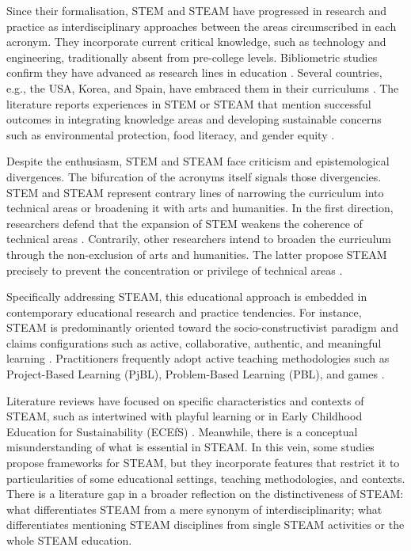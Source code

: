 \documentclass[english]{textolivre}
\begin{document}
Since their formalisation, STEM and STEAM have progressed in research and practice as interdisciplinary approaches between the areas circumscribed in each acronym. They incorporate current critical knowledge, such as technology and engineering, traditionally absent from pre-college levels. Bibliometric studies confirm they have advanced as research lines in education \cite{marin-marin_steam_2021}. Several countries, e.g., the USA, Korea, and Spain, have embraced them in their curriculums \cite{korea2013, ministerio2022real, ngss1900next}. The literature reports experiences in STEM or STEAM that mention successful outcomes in integrating knowledge areas and developing sustainable concerns such as environmental protection, food literacy, and gender equity \cite{costa-lizama_hack4women:_2022, silva-hormazabal_conectando_2022, stephenson_increasing_2022}.

Despite the enthusiasm, STEM and STEAM face criticism and epistemological divergences. The bifurcation of the acronyms itself signals those divergencies. STEM and STEAM represent contrary lines of narrowing the curriculum into technical areas or broadening it with arts and humanities. In the first direction, researchers defend that the expansion of STEM weakens the coherence of technical areas \cite{clements_stem_2021}. Contrarily, other researchers intend to broaden the curriculum through the non-exclusion of arts and humanities. The latter propose STEAM precisely to prevent the concentration or privilege of technical areas \cite{perignat_steam_2019}.

Specifically addressing STEAM, this educational approach is embedded in contemporary educational research and practice tendencies. For instance, STEAM is predominantly oriented toward the socio-constructivist paradigm and claims configurations such as active, collaborative, authentic, and meaningful learning \cite{schlesinger_cognitive_2020}. Practitioners frequently adopt active teaching methodologies such as Project-Based Learning (PjBL), Problem-Based Learning (PBL), and games \cite{aguilera_stem_2021}.

Literature reviews have focused on specific characteristics and contexts of STEAM, such as intertwined with playful learning or in Early Childhood Education for Sustainability (ECEfS) \cite{rodrigues-silva_predisposicoes_2022b, rodrigues-silva_educacion_2023a}. Meanwhile, there is a conceptual misunderstanding of what is essential in STEAM. In this vein, some studies propose frameworks for STEAM, but they incorporate features that restrict it to particularities of some educational settings, teaching methodologies, and contexts. There is a literature gap in a broader reflection on the distinctiveness of STEAM: what differentiates STEAM from a mere synonym of interdisciplinarity; what differentiates mentioning STEAM disciplines from single STEAM activities or the whole STEAM education.
\end{document}
